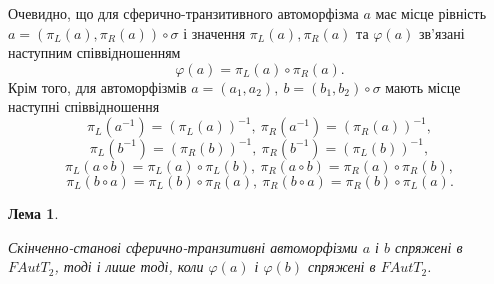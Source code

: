 \documentclass[a4paper,12pt]{article} \usepackage{a4wide}
\numberwithin{equation}{subsection}
\newtheorem{lemma}{Лема}[subsection]
\begin{document}
Очевидно, що для сферично-транзитивного автоморфізма $a$ має місце
  рівність $a=(\pi_L(a),\pi_R(a))\circ\sigma$ і значення
  $\pi_L(a),\pi_R(a)$ та $\varphi(a)$ зв'язані наступним
  співвідношенням  $$\varphi(a)=\pi_L(a)\circ \pi_R(a).$$ Крім того,
  для автоморфізмів $a=(a_1,a_2),\ b=(b_1,b_2)\circ \sigma$ мають
  місце наступні співвідношення
  $$\pi_L(a^{-1})=(\pi_L(a))^{-1},\ \pi_R(a^{-1})=(\pi_R(a))^{-1},$$
  $$\pi_L(b^{-1})=(\pi_R(b))^{-1},\ \pi_R(b^{-1})=(\pi_L(b))^{-1},$$
  $$\pi_L(a\circ b) =\pi_L(a)\circ \pi_L(b),\ \pi_R(a\circ b) =\pi_R(a)\circ \pi_R(b),$$
    $$\pi_L(b\circ a) =\pi_L(b)\circ \pi_R(a),\ \pi_R(b\circ a) =\pi_R(b)\circ \pi_L(a).$$

\begin{lemma}\label{unique_solution_upper_vertex}

 Скінченно-станові сферично-транзитивні автоморфізми $a$ і $b$  спряжені в $FAutT_2$,  тоді і лише тоді, коли
$\varphi(a)$ і $\varphi(b)$  спряжені в $FAutT_2$.

\end{lemma}
\end{document}
